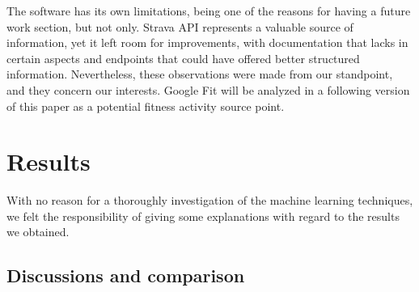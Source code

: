 \begin{table}[!htb]
  \begin{center}
    \label{tab:table4}
    \caption{Hardware specifications: Pimoroni's Flotilla series}
  \end{center}
\end{table}

The software has its own limitations, being one of the reasons for having a future work section, but not only. Strava API represents a valuable source of information, yet it left room for improvements, with documentation that lacks in certain aspects and endpoints that could have offered better structured information. Nevertheless, these observations were made from our standpoint, and they concern our interests. Google Fit will be analyzed in a following version of this paper as a potential fitness activity source point.

\section{Results}

With no reason for a thoroughly investigation of the machine learning techniques, we felt the responsibility of giving some explanations with regard to the results we obtained.

\subsection*{Discussions and comparison}

